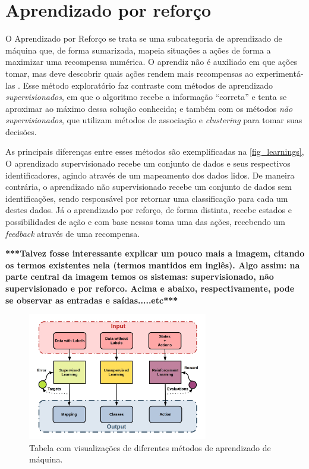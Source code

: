 \section{Aprendizado por refor{\c c}o}

O Aprendizado por Refor{\c c}o se trata se uma subcategoria de
aprendizado de m{\'a}quina que, de forma sumarizada, mapeia situa{\c
  c}{\~o}es a a{\c c}{\~o}es de forma a maximizar uma recompensa
num{\'e}rica. O aprendiz n{\~a}o {\'e} auxiliado em que a{\c c}{\~o}es
tomar, mas deve descobrir quais a{\c c}{\~o}es rendem mais recompensas
ao experiment{\'a}-las \cite{kaelbling1996}. Esse m{\'e}todo
explorat{\'o}rio faz contraste com m{\'e}todos de aprendizado
\textit{supervisionados}, em que o algoritmo recebe a informa{\c
  c}{\~a}o ``correta'' e tenta se aproximar ao m{\'a}ximo dessa
solu{\c c}{\~a}o conhecida; e tamb{\'e}m com os m{\'e}todos
\textit{n{\~a}o supervisionados}, que utilizam m{\'e}todos de
associa{\c c}{\~a}o e \textit{clustering} para tomar suas
decis{\~o}es. 

As principais diferen{\c c}as entre esses m{\'e}todos são exemplificadas na 
\autoref{fig_learnings}, O aprendizado supervisionado recebe um conjunto de dados
e seus respectivos identificadores, agindo através de um mapeamento dos dados lidos.
De maneira contrária, o aprendizado não supervisionado recebe um conjunto de dados 
sem identificações, sendo responsável por retornar uma classificação para cada um
destes dados. Já o aprendizado por reforço, de forma distinta, recebe estados e 
possibilidades de ação e com base nessas toma uma das ações, recebendo um 
\textit{feedback} através de uma recompensa. 


\textbf{***Talvez fosse interessante explicar um pouco mais a imagem,
citando os termos existentes nela (termos mantidos em inglês).
Algo assim: na parte central da imagem temos os sistemas: supervisionado,
não supervisionado e por reforco. Acima e abaixo, respectivamente,
pode se observar as entradas e saídas.....etc***}

\begin{figure}[htb]
  \centering
  \caption{\label{fig_learnings}Tabela com visualiza{\c c}{\~o}es de diferentes m{\'e}todos de aprendizado de m{\'a}quina.}
  \includegraphics[width=0.7\textwidth]{images/unsupervised_supervised_reinforcement.jpeg}
\end{figure}

